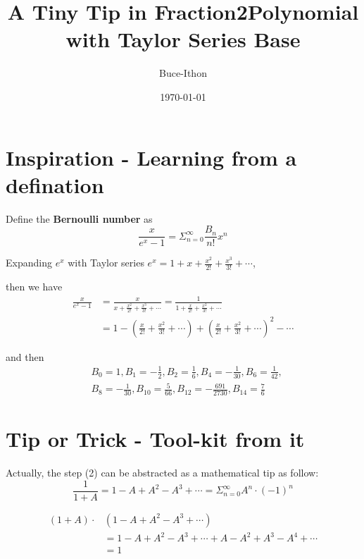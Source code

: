 \documentclass{Math_Note}
\title{A Tiny Tip in Fraction2Polynomial with Taylor Series Base}
\author{Buce-Ithon}
\date{\today}
\begin{document}
\maketitle

\newpage
\tableofcontents
\newpage

\section{Inspiration - Learning from a defination}
\begin{df}
    Define the \textbf{Bernoulli number} as
    \begin{equation}
        \frac{x}{e^{x}-1} = \Sigma_{n=0}^{\infty}\frac{B_{n}}{n!}x^{n}
    \end{equation} 
\end{df}    
Expanding $e^{x}$ with Taylor series $e^{x}=1+x+\frac{x^{2}}{2!}+\frac{x^{3}}{3!}+\cdots$, 

then we have
\begin{equation}
    \begin{split}
        \frac{x}{e^{x}-1} &= \frac{x}{x+\frac{x^{2}}{2!}+\frac{x^{3}}{3!}+\cdots} = \frac{1}{1+\frac{x}{2!}+\frac{x^2}{3!}+\cdots} \\
        &=1 - \left(\frac{x}{2!}+\frac{x^2}{3!}+\cdots\right) + \left(\frac{x}{2!}+\frac{x^2}{3!}+\cdots\right)^2-\cdots
    \end{split}
\end{equation}

and then
\begin{equation}
    \begin{split}
        &B_{0} = 1, B_{1} = -\frac{1}{2}, B_{2} = \frac{1}{6}, B_{4} = -\frac{1}{30}, B_{6} = \frac{1}{42}, \\
        &B_{8} = -\frac{1}{30}, B_{10} = \frac{5}{66}, B_{12} = -\frac{691}{2730}, B_{14} = \frac{7}{6}
    \end{split}
\end{equation}

\section{Tip or Trick - Tool-kit from it}
Actually, the step (2) can be abstracted as a mathematical tip as follow:
\begin{equation}
    \frac{1}{1+A} = 1 - A + A^{2} -A^{3} + \cdots = \Sigma_{n=0}^{\infty}A^{n}\cdot\left(-1\right)^{n}
\end{equation}
\begin{pf}
    \begin{equation}
        \begin{split}
            {\left(1+A\right)}\cdot&{\left(1 - A + A^{2} -A^{3} + \cdots\right)} \\
            &= {1 - A + A^{2} -A^{3} + \cdots} + {A - A^{2} + A^{3} - A^{4} + \cdots}\\
            &= 1           
        \end{split}
    \end{equation}
\end{pf}
\end{document}
